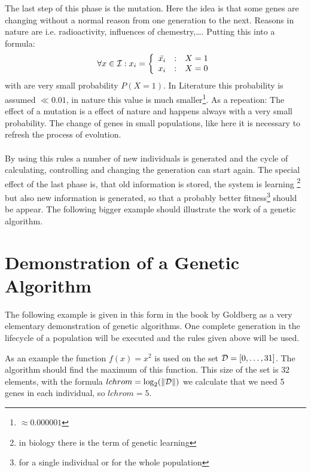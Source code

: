 The last step of this phase is the mutation. Here the idea is that some genes
are changing without a normal reason from one generation to the next. Reasons
in nature are i.e. radioactivity, influences of chemestry,\dots . Putting this 
into a formula:
$$ \forall x \in {\cal I} : x_i = \left\{ \begin{array}{r@{\quad:\quad}l}
         \bar{x_i} & X=1\\ x_i & X=0 \end{array} \right. $$
with are very small probability $P(X = 1)$. In Literature this probability is
assumed $\ll 0.01$, in nature this value is much smaller\footnote{$\approx 0.000001$}.
As a repeation: The effect of a mutation is a effect of nature and happens always
with a very small probability. The change of genes in small populations, like
here it is necessary to refresh the process of evolution.\\
\\
By using this rules a number of new individuals is generated and the cycle of
calculating, controlling and changing the generation can start again. The special
effect of the last phase is, that old information is stored, the system is learning
\footnote{in biology there is the term of genetic learning} but also new information
is generated, so that a probably better fitness\footnote{for a single individual
or for the whole population} should be appear. The following bigger example should
illustrate the work of a genetic algorithm.
\section{Demonstration of a Genetic Algorithm}
The following example is given in this form in the book by Goldberg\cite{Gol89}
as a very elementary demonstration of genetic algorithms. One complete generation
in the lifecycle of a population will be executed and the rules given above
will be used.

As an example the function $f(x) = x^2$ is used on the set ${\cal D} = [0,\dots,31]$.
The algorithm should find the maximum of this function. This size of the set
is $32$ elements, with the formula $lchrom = \log_2 (\| {\cal D} \|)$ we calculate
that we need 5 genes in each individual, so $lchrom = 5$.

